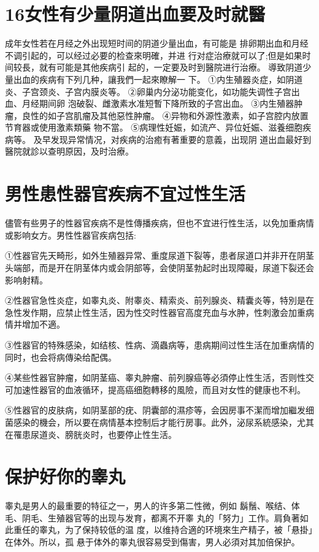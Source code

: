 \documentclass[12pt,UTF8]{ctexbook}
\begin{document}
\section{16女性有少量阴道出血要及时就醫}
成年女性若在月经之外出现短时间的阴道少量出血，有可能是
排卵期出血和月经不调引起的，可以经过必要的检查來明確，并进
行对症治療就可以了;但是如果时间较長，就有可能是其他疾病引
起的，一定要及时到醫院进行治療。
導致阴道少量出血的疾病有下列几种，讓我們一起來瞭解一
下。
①内生殖器炎症，如阴道炎、子宫颈炎、子宫内膜炎等。
②卵巢内分泌功能变化，如功能失调性子宫出血、月经期间卵
泡破裂、雌激素水准短暫下降所致的子宫出血。
③内生殖器肿瘤，良性的如子宫肌瘤及其他惡性肿瘤。
④异物和外源性激素，如子宫腔内放置节育器或使用激素類藥
物不當。
⑤病理性妊娠，如流产、异位妊娠、滋養细胞疾病等。
及早发现异常情况，对疾病的治癒有著重要的意義，出现阴
道出血最好到醫院就診以查明原因，及时治療。

\section{男性患性器官疾病不宜过性生活}

儘管有些男子的性器官疾病不是性傳播疾病，但也不宜进行性生活，以免加重病情或影响女方。男性性器官疾病包括:

①性器官先天畸形，如外生殖器异常、重度尿道下裂等，患者尿道口并非开在阴茎头端部，而是开在阴茎体内或会阴部等，会使阴茎勃起时出现障礙，尿道下裂还会影响射精。

②性器官急性炎症，如睾丸炎、附睾炎、精索炎、前列腺炎、精囊炎等，特別是在急性发作期，应禁止性生活，因为性交时性器官高度充血与水肿，性刺激会加重病情并增加不適。

③性器官的特殊感染，如结核、性病、滴蟲病等，患病期间过性生活在加重病情的同时，也会将病傳染给配偶。

④某些性器官肿瘤，如阴茎癌、睾丸肿瘤、前列腺癌等必須停止性生活，否则性交可加速性器官的血液循环，提高癌细胞轉移的風險，而且对女性的健康也不利。

⑤性器官的皮肤病，如阴茎部的疣、阴囊部的濕疹等，会因房事不潔而增加繼发细菌感染的機会，所以要在病情基本控制后才能行房事。此外，泌尿系統感染，尤其在罹患尿道炎、膀胱炎时，也要停止性生活。

\section{保护好你的睾丸}

睾丸是男人的最重要的特征之一，男人的许多第二性微，例如
鬍鬚、喉结、体毛、阴毛、生殖器官等的出现与发育，都离不开睾
丸的「努力」工作。肩負著如此重任的睾丸，为了保持较低的温
度，以维持合適的环境來生产精子，被「悬掛」在体外。所以，孤
悬于体外的睾丸很容易受到傷害，男人必須对其加倍保护。
\end{document}

